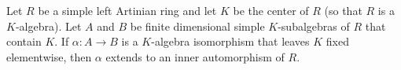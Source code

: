 Let $R$ be a simple left Artinian ring and let $K$ be the center of $R$ (so that $R$ is a $K$-algebra). Let $A$ and $B$ be finite dimensional simple $K$-subalgebras of $R$ that contain $K$. If $\alpha : A \to B$ is a $K$-algebra isomorphism that leaves $K$ fixed elementwise, then $\alpha$ extends to an inner automorphism of $R$.
